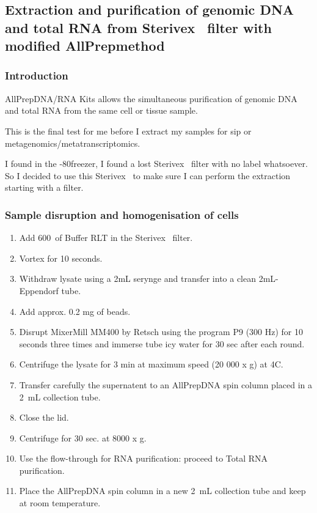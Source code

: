 \subsection{Extraction and purification of genomic DNA and total RNA from Sterivex\texttrademark~ filter with modified AllPrep\cR method}
\label{task:20180320_cj2}

\subsubsection{Introduction}

AllPrep\cR DNA/RNA Kits allows the simultaneous purification of genomic DNA and total RNA from the same cell or tissue sample.

This is the final test for me before I extract my samples for \gls{sip} or metagenomics/metatranscriptomics. 

I found in the -80\degree freezer, I found a lost Sterivex\texttrademark~ filter with no label whatsoever. So I decided to use this Sterivex\texttrademark~ to make sure I can perform the extraction starting with a filter. 

\subsubsection{Sample disruption and homogenisation of cells}

\begin{enumerate}
\item Add 600~\uL of Buffer RLT in the Sterivex\texttrademark~ filter.
\item Vortex for 10 seconds.
\item Withdraw lysate using a 2mL serynge and transfer into a clean 2mL-Eppendorf tube.
\item Add approx. 0.2 mg of beads. 
\item Disrupt MixerMill MM400 by Retsch using the program P9 (300 Hz) for 10 seconds three times and immerse tube icy water for 30 sec after each round.
\item Centrifuge the lysate for 3 min at maximum speed (20 000 x g) at 4\degree C.
\item Transfer carefully the supernatent to an AllPrep\cR DNA spin column placed in a 2~mL collection tube.
\item Close the lid.
\item Centrifuge for 30 sec. at 8000 x g.
\item Use the flow-through for RNA purification: proceed to Total RNA purification.
\item Place the AllPrep\cR DNA spin column in a new 2~mL collection tube and keep at room temperature.
\end{enumerate}

